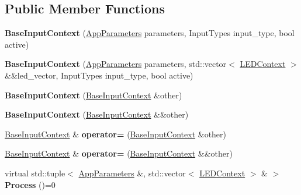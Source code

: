 \subsection*{Public Member Functions}
\begin{DoxyCompactItemize}
\item 
\mbox{\label{classBaseInputContext_a7d8ee828f7bf345c42654d2d35c6b54b}} 
{\bfseries Base\+Input\+Context} (\hyperlink{structAppParameters}{App\+Parameters} parameters, Input\+Types input\+\_\+type, bool active)
\item 
\mbox{\label{classBaseInputContext_ab01c79b8298af7d22cca34d4cee4ed32}} 
{\bfseries Base\+Input\+Context} (\hyperlink{structAppParameters}{App\+Parameters} parameters, std\+::vector$<$ \hyperlink{classLEDContext}{L\+E\+D\+Context} $>$ \&\&led\+\_\+vector, Input\+Types input\+\_\+type, bool active)
\item 
\mbox{\label{classBaseInputContext_a2a2342b849914cdad5e5fafb985198fe}} 
{\bfseries Base\+Input\+Context} (\hyperlink{classBaseInputContext}{Base\+Input\+Context} \&other)
\item 
\mbox{\label{classBaseInputContext_a766e7f1c9c02069dec98870c84939d1e}} 
{\bfseries Base\+Input\+Context} (\hyperlink{classBaseInputContext}{Base\+Input\+Context} \&\&other)
\item 
\mbox{\label{classBaseInputContext_a0c3354b22b4f98a9f29f0b8caff28593}} 
\hyperlink{classBaseInputContext}{Base\+Input\+Context} \& {\bfseries operator=} (\hyperlink{classBaseInputContext}{Base\+Input\+Context} \&other)
\item 
\mbox{\label{classBaseInputContext_a63d4e572f54a59ee4fb045e066eaa132}} 
\hyperlink{classBaseInputContext}{Base\+Input\+Context} \& {\bfseries operator=} (\hyperlink{classBaseInputContext}{Base\+Input\+Context} \&\&other)
\item 
\mbox{\label{classBaseInputContext_a307ef6df7438b9ee911b190808b83e1f}} 
virtual std\+::tuple$<$ \hyperlink{structAppParameters}{App\+Parameters} \&, std\+::vector$<$ \hyperlink{classLEDContext}{L\+E\+D\+Context} $>$ \& $>$ {\bfseries Process} ()=0

\end{DoxyCompactItemize}
